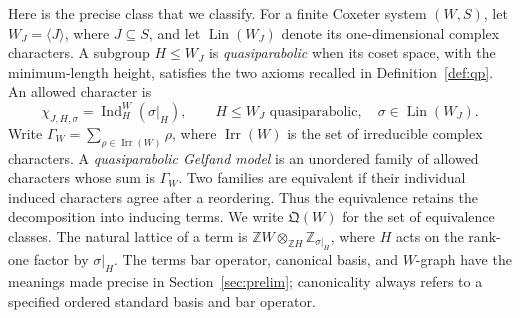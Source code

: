 \documentclass[11pt]{article}
\numberwithin{equation}{section}
\theoremstyle{definition}
\DeclareMathOperator{\Ind}{Ind}
\DeclareMathOperator{\Irr}{Irr}
\DeclareMathOperator{\Lin}{Lin}
\newcommand{\Z}{\mathbb Z}
\newcommand{\QQ}{\mathfrak Q}
\begin{document}
Here is the precise class that we classify.
For a finite Coxeter system \((W,S)\), let \(W_J=\langle J\rangle\), where \(J\subseteq S\), and let \(\Lin(W_J)\) denote its one-dimensional complex characters.
A subgroup \(H\leq W_J\) is \emph{quasiparabolic} when its coset space, with the minimum-length height, satisfies the two axioms recalled in Definition~\ref{def:qp}.
An allowed character is
\[
 \chi_{J,H,\sigma}=\Ind_H^W(\sigma|_H),
 \qquad H\leq W_J\text{ quasiparabolic},\quad \sigma\in\Lin(W_J).
\]
Write \(\Gamma_W=\sum_{\rho\in\Irr(W)}\rho\), where \(\Irr(W)\) is the set of irreducible complex characters.
A \emph{quasiparabolic Gelfand model} is an unordered family of allowed characters whose sum is \(\Gamma_W\).
Two families are equivalent if their individual induced characters agree after a reordering.
Thus the equivalence retains the decomposition into inducing terms.
We write \(\QQ(W)\) for the set of equivalence classes.
The natural lattice of a term is
\(\Z W\otimes_{\Z H}\Z_{\sigma|_H}\), where \(H\) acts on the rank-one factor by \(\sigma|_H\).
The terms bar operator, canonical basis, and \(W\)-graph have the meanings made precise in Section~\ref{sec:prelim}; canonicality always refers to a specified ordered standard basis and bar operator.
\end{document}
